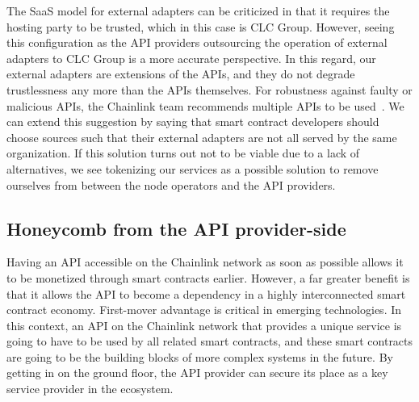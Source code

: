 \documentclass[12pt]{article}
\begin{document}
The SaaS model for external adapters can be criticized in that it requires the hosting party to be trusted, which in this case is CLC Group.
However, seeing this configuration as the API providers outsourcing the operation of external adapters to CLC Group is a more accurate perspective.
In this regard, our external adapters are extensions of the APIs, and they do not degrade trustlessness any more than the APIs themselves.
For robustness against faulty or malicious APIs, the Chainlink team recommends multiple APIs to be used~\cite{Ellis:2017}.
We can extend this suggestion by saying that smart contract developers should choose sources such that their external adapters are not all served by the same organization.
If this solution turns out not to be viable due to a lack of alternatives, we see tokenizing our services as a possible solution to remove ourselves from between the node operators and the API providers.

\subsection{Honeycomb from the API provider-side}
\label{sec:honeycombfromtheapiproviderside}

Having an API accessible on the Chainlink network as soon as possible allows it to be monetized through smart contracts earlier.
However, a far greater benefit is that it allows the API to become a dependency in a highly interconnected smart contract economy.
First-mover advantage is critical in emerging technologies.
In this context, an API on the Chainlink network that provides a unique service is going to have to be used by all related smart contracts, and these smart contracts are going to be the building blocks of more complex systems in the future.
By getting in on the ground floor, the API provider can secure its place as a key service provider in the ecosystem.
\end{document}
